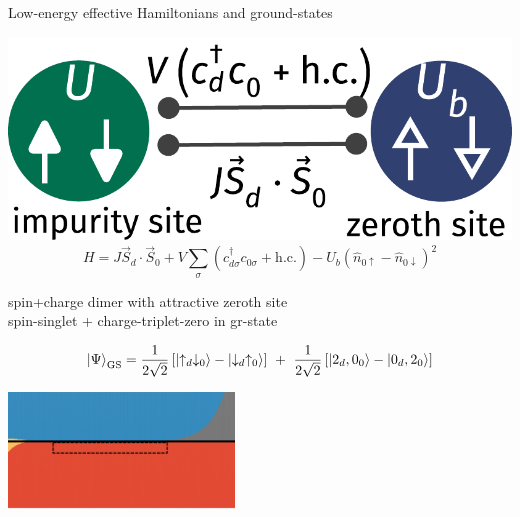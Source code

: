 \documentclass[8pt,aspectratio=169]{beamer}
\begin{document}
\begin{frame}{Low-energy effective Hamiltonians and ground-states}
{{\begin{minipage}{0.4\textwidth}
\includegraphics[width=\textwidth]{siam-JV.pdf}
\[H = J \vec{S}_d\cdot\vec{S}_0 + V \sum_\sigma \left( c^\dagger_{d\sigma}c_{0\sigma} + \text{h.c.} \right) - U_b\left( \hat n_{0 \uparrow} - \hat n_{0 \downarrow} \right)^2\]
\end{minipage}
\hspace*{\fill}
\begin{minipage}{0.45\textwidth}
\vspace*{\fill}
\begin{enumerate}
\nitem \alert{spin+charge} dimer with attractive zeroth site\\[6pt]
\nitem spin-singlet + charge-triplet-zero in gr-state\\[10pt]
\end{enumerate}
\[\ket{\Psi}_\text{GS} = \frac{1}{2\sqrt 2}\left[\ket{\uparrow_d \downarrow_0} - \ket{\downarrow_d \uparrow_0}\right] ~ + ~ \frac{1}{2\sqrt 2}\left[\ket{2_d, 0_0} - \ket{0_d, 2_0} \right] \]
\end{minipage}
}

\vspace*{\fill}

\includegraphics[width=0.45\textwidth]{phase-map-MIT2.pdf}
}

\end{frame}
\end{document}
